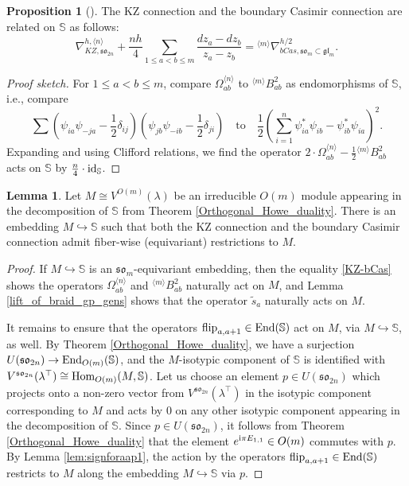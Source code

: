 \documentclass[10pt]{amsart}
\numberwithin{equation}{section}
\theoremstyle{definition}
\newtheorem{lemma}[theorem]{Lemma}
\newtheorem{proposition}[theorem]{Proposition}
\newcommand{\Hom}{{\rm Hom}}
\newcommand{\End}{{\rm End}}
\newcommand{\id}{{\rm id}}
\newcommand{\son}[1][2n]{\mathfrak{so}_{#1}}
\newcommand{\som}[1][m]{\mathfrak{so}_{#1}}
\newcommand{\flip}{\operatorname{flip}}
\newcommand{\howespin}{\boldsymbol{\mathbb{S}}}
\begin{document}
\begin{proposition}[{\cite[Theorem 10.9]{MR4983792}}]\label{Gauge_equiv}
The KZ connection and the boundary Casimir connection are related on $\howespin$ as follows:
\begin{equation}\label{KZ-bCas}
    \nabla_{KZ,\son}^{h, \langle n \rangle}+\frac{nh}{4}\sum_{1\le a<b\le m}\frac{dz_a-dz_b}{z_a-z_b}={}^{\langle m\rangle}\nabla_{bCas,\mathfrak{so}_m\subset \mathfrak{gl}_m}^{h/2}.
\end{equation}
\end{proposition}
\begin{proof}[Proof sketch]
    For $1\le a< b\le m$, compare $\Omega_{ab}^{\langle n\rangle}$ to ${}^{\langle m\rangle}B_{ab}^2$ as endomorphisms of $\howespin$, i.e., compare
    \[
    \sum (\psi_{ia}\psi_{-ja} - \frac{1}{2}\delta_{ij})(\psi_{jb}\psi_{-ib} - \frac{1}{2}\delta_{ji}) \quad \text{to} \quad \frac{1}{2}\left(\sum_{i=1}^n\psi_{ia}^*\psi_{ib}-\psi_{ib}^*\psi_{ia}\right)^2.
    \]
    Expanding and using Clifford relations, we find the operator $2\cdot \Omega_{ab}^{\langle n \rangle} - \frac{1}{2}{}^{\langle m\rangle}B_{ab}^2$ acts on $\howespin$ by $\frac{n}{4}\cdot \id_{\howespin}$.
\end{proof}

\begin{lemma}
    Let $M\cong V^{O(m)}(\lambda)$ be an irreducible $O(m)$ module appearing in the decomposition of $\howespin$ from Theorem \ref{Orthogonal_Howe_duality}. There is an embedding $M\hookrightarrow \mathbb{S}$ such that both the KZ connection and the boundary Casimir connection admit fiber-wise (equivariant) restrictions to $M$.
\end{lemma} 

\begin{proof}
    If $M\hookrightarrow \mathbb{S}$ is an $\som$-equivariant embedding, then the equality \eqref{KZ-bCas} shows the operators $\Omega_{ab}^{\langle n \rangle}$ and ${}^{\langle m\rangle}B^2_{ab}$ naturally act on $M$, and Lemma \ref{lift_of_braid_gp_gens} shows that the operator $\widetilde{s}_a$ naturally acts on $M$.

It remains to ensure that the operators $\flip_{a,a+1}\in \End(\howespin)$ act on $M$, via $M\hookrightarrow \howespin$, as well. By Theorem \ref{Orthogonal_Howe_duality}, we have a surjection $U(\son)\rightarrow \End_{O(m)}(\howespin)$, and the $M$-isotypic component of $\howespin$ is identified with $V^{\son}(\lambda^{\top})\cong \Hom_{O(m)}(M, \howespin)$. Let us choose an element $p\in U(\son)$ which projects onto a non-zero vector from $V^{\son}(\lambda^{\top})$ in the isotypic component corresponding to $M$ and acts by $0$ on any other isotypic component appearing in the decomposition of $\mathbb{S}$. Since $p\in U(\son)$, it follows from Theorem \ref{Orthogonal_Howe_duality} that the element $e^{{\rm i}\pi E_{1,1}}\in O(m)$ commutes with $p$. By Lemma \ref{lem:signforaap1}, the action by the operators $\flip_{a,a+1}\in \End(\howespin)$ restricts to $M$ along the embedding $M\hookrightarrow \mathbb{S}$ via $p$.
\end{proof}
\end{document}
